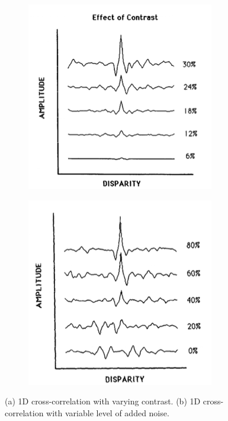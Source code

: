 \begin{figure}[htbp]
    \begin{subfigure}[b]{0.5\textwidth}
        \includegraphics[width=\textwidth]{./Template_Figures/cormack_cont}
        \caption{}\label{fig:cormack_cont}
    \end{subfigure}
    \begin{subfigure}[b]{0.5\textwidth}
        \includegraphics[width=\textwidth]{./Template_Figures/cormack_noise}
        \caption{}\label{fig:cormack_noise}
    \end{subfigure}
    \caption{(a) 1D cross-correlation with varying contrast. (b) 1D cross-correlation with variable level of added noise.\label{fig:cormack}}
\end{figure}

